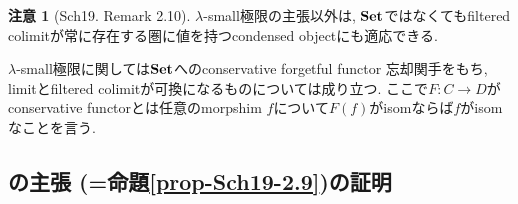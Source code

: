 \documentclass[dvipdfmx,a4paper,11pt]{article}
\theoremstyle{definition}
\newtheorem{rem}[thm]{注意}
\begin{document}
 
 \begin{rem}[Sch19. Remark 2.10]
 $\lambda$-small極限の主張以外は, ${\bf Set}$ではなくてもfiltered colimitが常に存在する圏に値を持つcondensed objectにも適応できる.
 
  $\lambda$-small極限に関しては${\bf Set}$へのconservative forgetful functor 忘却関手をもち, limitとfiltered colimitが可換になるものについては成り立つ. 
   ここで$F : C \to D$がconservative functorとは任意のmorpshim $f$について$F(f)$がisomならば$f$がisomなことを言う. 
 \end{rem}


\subsection{\cite[Proposition 2.9]{Sch19}の主張 (=命題\ref{prop-Sch19-2.9})の証明}
\end{document}
